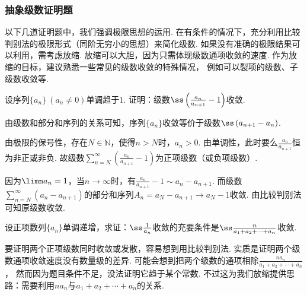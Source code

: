 \subsubsection{抽象级数证明题}

以下几道证明题中，我们强调极限思想的运用.
在有条件的情况下，充分利用比较判别法的极限形式（同阶无穷小的思想）来简化级数.
如果没有准确的极限结果可以利用，需考虑放缩.
放缩可以大胆，因为只需体现级数通项收敛的速度.
作为放缩的目标，建议熟悉一些常见的级数收敛的特殊情况，
例如可以裂项的级数、子级数收敛等.

\begin{example}
\label{ex:supp-series-11}
设序列$\{ a_n \}~(a_n \ne 0)$单调趋于$1$. 证明：级数$\ss \left( \frac{a_n}{a_{n+1} } - 1 \right)$收敛.
\end{example}

\begin{analysis}
由级数和部分和序列的关系可知，序列$\{ a_n \}$收敛等价于级数$\ss \left( a_{n+1} - a_{n} \right)$.
\end{analysis}

\begin{solution}
由极限的保号性，存在$N \in \mathbb{N}$，使得$n > N$时，$a_n > 0$.
    由单调性，此时要么$\frac{a_n}{a_{n+1}}$恒为非正或非负.
    故级数$\sum_{n=N}^{\infty} \left( \frac{a_n}{a_{n+1} } - 1 \right)$为正项级数（或负项级数）.

    因为$\limn a_n = 1$，当$n \to \infty$时，有$\frac{a_n}{a_{n+1} } - 1 \sim a_n - a_{n+1}$.
    而级数$\sum_{n=N}^{\infty} \left( a_n - a_{n+1}\right)$的部分和序列$A_n = a_N - a_{n+1} \to a_N - 1$收敛.
    由比较判别法可知原级数收敛.
\end{solution}

\begin{example}
\label{ex:supp-series-12}
设正项数列$\{ a_n \}$单调递增，求证：$\ss \frac{1}{a_n}$收敛的充要条件是$\ss \frac{n}{a_1 + a_2 + \cdots + a_n}$收敛.
\end{example}

\begin{analysis}
要证明两个正项级数同时收敛或发散，容易想到用比较判别法.
    实质是证明两个级数通项收敛速度没有数量级的差异.
    可能会想到把两个级数的通项相除$\frac{na_n}{a_1 + a_2 + \cdots + a_n}$，
    然而因为题目条件不足，没法证明它趋于某个常数.
    不过这为我们放缩提供思路：需要利用$na_n$与$a_1 + a_2 + \cdots + a_n$的关系.
\end{analysis}

